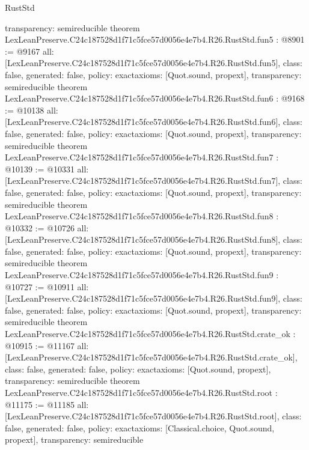 \begin{lexlean}{RustStd}
\begin{coremodule}
{  transparency: semireducible
}
theorem LexLeanPreserve.C24c187528d1f71c5fce57d0056e4e7b4.R26.RustStd.fun5 : @8901 := @9167 {
  all: [LexLeanPreserve.C24c187528d1f71c5fce57d0056e4e7b4.R26.RustStd.fun5],
  class: false,
  generated: false,
  policy: exact{axioms: [Quot.sound, propext]},
  transparency: semireducible
}
theorem LexLeanPreserve.C24c187528d1f71c5fce57d0056e4e7b4.R26.RustStd.fun6 : @9168 := @10138 {
  all: [LexLeanPreserve.C24c187528d1f71c5fce57d0056e4e7b4.R26.RustStd.fun6],
  class: false,
  generated: false,
  policy: exact{axioms: [Quot.sound, propext]},
  transparency: semireducible
}
theorem LexLeanPreserve.C24c187528d1f71c5fce57d0056e4e7b4.R26.RustStd.fun7 : @10139 := @10331 {
  all: [LexLeanPreserve.C24c187528d1f71c5fce57d0056e4e7b4.R26.RustStd.fun7],
  class: false,
  generated: false,
  policy: exact{axioms: [Quot.sound, propext]},
  transparency: semireducible
}
theorem LexLeanPreserve.C24c187528d1f71c5fce57d0056e4e7b4.R26.RustStd.fun8 : @10332 := @10726 {
  all: [LexLeanPreserve.C24c187528d1f71c5fce57d0056e4e7b4.R26.RustStd.fun8],
  class: false,
  generated: false,
  policy: exact{axioms: [Quot.sound, propext]},
  transparency: semireducible
}
theorem LexLeanPreserve.C24c187528d1f71c5fce57d0056e4e7b4.R26.RustStd.fun9 : @10727 := @10911 {
  all: [LexLeanPreserve.C24c187528d1f71c5fce57d0056e4e7b4.R26.RustStd.fun9],
  class: false,
  generated: false,
  policy: exact{axioms: [Quot.sound, propext]},
  transparency: semireducible
}
theorem LexLeanPreserve.C24c187528d1f71c5fce57d0056e4e7b4.R26.RustStd.crate_ok : @10915 := @11167 {
  all: [LexLeanPreserve.C24c187528d1f71c5fce57d0056e4e7b4.R26.RustStd.crate_ok],
  class: false,
  generated: false,
  policy: exact{axioms: [Quot.sound, propext]},
  transparency: semireducible
}
theorem LexLeanPreserve.C24c187528d1f71c5fce57d0056e4e7b4.R26.RustStd.root : @11175 := @11185 {
  all: [LexLeanPreserve.C24c187528d1f71c5fce57d0056e4e7b4.R26.RustStd.root],
  class: false,
  generated: false,
  policy: exact{axioms: [Classical.choice, Quot.sound, propext]},
  transparency: semireducible
}


\end{coremodule}
\end{lexlean}
